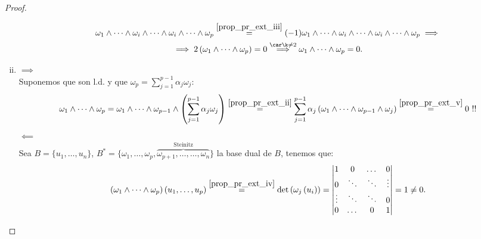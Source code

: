 \begin{proof}
\begin{enumerate}[i)]
\begin{gather*}
            \omega_1 \wedge \dots \wedge \omega_i \wedge \dots \wedge
            \omega_i \wedge \dots \wedge \omega_p \stackrel{%
            \ref{prop_pr_ext_iii}}{=} (-1) \omega_1 \wedge \dots \wedge
            \omega_i \wedge \dots \wedge \omega_i \wedge \dots \wedge
            \omega_p \implies \\
            \implies 2\left( \omega_1 \wedge \dots \wedge \omega_p
            \right) = 0 \stackrel{\car \k \neq 2}{\implies} \omega_1
            \wedge \dots \wedge \omega_p = 0.
        \end{gather*}
    \item
        $ \implies $ \\
        Suponemos que son l.d. y que $ \omega_p = \sum_{j=1}^{p-1}
        \alpha_j \omega_j $:
        \[
            \omega_1 \wedge \dots \wedge \omega_p = \omega_1 \wedge
            \dots \wedge \omega_{p-1} \wedge \left( \sum_{j=1}^{p-1}
            \alpha_j \omega_j \right) \stackrel{%
            \ref{prop_pr_ext_ii}}{=} \sum_{j=1}^{p-1} \alpha_j \left(
            \omega_1 \wedge \dots \wedge \omega_{p-1} \wedge \omega_j
            \right) \stackrel{%
            \ref{prop_pr_ext_v}}{=} 0 \text{ } !!
        \]
        $ \impliedby $ \\
        Sea $ B=\{u_1,\dots,u_n\} $, $ B^*=\{\omega_1, \dots, \omega_p,\overbrace
        {\omega_{p+1},\dots, \dots, \omega_n}^{\text{Steinitz}} \} $ la
        base dual de $ B $, tenemos que:
        \[
            \left( \omega_1 \wedge \dots \wedge \omega_p \right) \left(
            u_1,\dots,u_p \right) \stackrel{%
            \ref{prop_pr_ext_iv}}{=} \det\left( \omega_j \left(u_i
            \right) \right) =
            \begin{vmatrix}
                1 & 0 & \dots & 0 \\
                0 & \ddots & \ddots & \vdots \\
                \vdots & \ddots & \ddots & 0 \\
                0 & \dots & 0 & 1
            \end{vmatrix}
            = 1 \neq 0.
        \]
\end{enumerate}
\end{proof}


